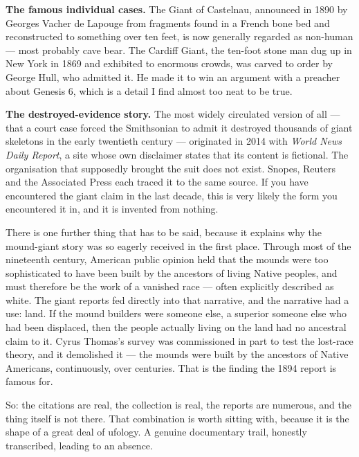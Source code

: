\textbf{The famous individual cases.} The Giant of Castelnau, announced in 1890 by Georges
Vacher de Lapouge from fragments found in a French bone bed and reconstructed to something over
ten feet, is now generally regarded as non-human --- most probably cave bear. The Cardiff Giant,
the ten-foot stone man dug up in New York in 1869 and exhibited to enormous crowds, was carved
to order by George Hull, who admitted it. He made it to win an argument with a preacher about
Genesis 6, which is a detail I find almost too neat to be true.

\textbf{The destroyed-evidence story.} The most widely circulated version of all --- that a
court case forced the Smithsonian to admit it destroyed thousands of giant skeletons in the
early twentieth century --- originated in 2014 with \emph{World News Daily Report}, a site whose
own disclaimer states that its content is fictional. The organisation that supposedly brought
the suit does not exist. Snopes, Reuters and the Associated Press each traced it to the same
source. If you have encountered the giant claim in the last decade, this is very likely the
form you encountered it in, and it is invented from nothing.

There is one further thing that has to be said, because it explains why the mound-giant story
was so eagerly received in the first place. Through most of the nineteenth century, American
public opinion held that the mounds were too sophisticated to have been built by the ancestors
of living Native peoples, and must therefore be the work of a vanished race --- often
explicitly described as white. The giant reports fed directly into that narrative, and the
narrative had a use: land. If the mound builders were someone else, a superior someone else who
had been displaced, then the people actually living on the land had no ancestral claim to it.
Cyrus Thomas's survey was commissioned in part to test the lost-race theory, and it demolished
it --- the mounds were built by the ancestors of Native Americans, continuously, over centuries.
That is the finding the 1894 report is famous for. 

So: the citations are real, the collection is real, the reports are numerous, and the thing
itself is not there. That combination is worth sitting with, because it is the shape of a great
deal of ufology. A genuine documentary trail, honestly transcribed, leading to an absence.

